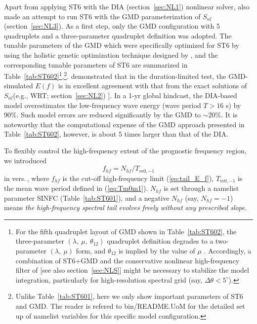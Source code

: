 Apart from applying {\code ST6} with the {\code DIA} (section~\ref{sec:NL1}) nonlinear solver, \citet{Liu2019}
also made an attempt to run {\code ST6} with the {\code GMD} parameterization of $S_{nl}$
(section~\ref{sec:NL3}). As a first step, only the {\code GMD} configuration with
5 quadruplets and a three-parameter quadruplet definition
\citep[i.e., {\code G35} in][]{tol:OMOD13d} was adopted. The tunable parameters
of the {\code GMD} which were specifically optimized for {\code ST6} by using the holistic
genetic optimization technique designed by \citet{tol:OMOD13e}, and the
corresponding tunable parameters of {\code ST6} are summarized in
Table~\ref{tab:ST602}\footnote{For the fifth quadruplet layout of {\code GMD} shown
in Table~\ref{tab:ST602}, the three-parameter $(\lambda,\ \mu,\ \theta_{12})$
quadruplet definition degrades to a two-parameter $(\lambda,\ \mu)$ form, and
$\theta_{12}$ is implied by the value of $\mu$ \citep{tol:OMOD13d}. Accordingly,
a combination of {\code ST6+GMD} and the conservative nonlinear high-frequency
filter of \citet{tol:OMOD11} [see also section~\ref{sec:NLS}] might be
necessary to stabilize the model integration, particularly for high-resolution
spectral grid (say, $\Delta \theta < 5^{\circ}$).},\footnote{Unlike
Table~\ref{tab:ST601}, here we only show important parameters of {\code ST6} and
{\code GMD}. The reader is refered to {\code bin/README.UoM} for the detailed
set up of namelist variables for this specific model configuration.}.
\citet{Liu2019} demonstrated that in the duration-limited test, the
{\code GMD}-simulated $E(f)$ is in excellent agreement with that from the exact
 solutions of $S_{nl}$(e.g., {\code WRT}; section~\ref{sec:NL2}) \citep[see also][]{tol:OMOD13d}]. In a 1-yr global
hindcast, the {\code DIA}-based model overestimates the low-frequency wave energy
(wave period $T > 16$ s) by 90\%. Such model errors are reduced significantly
by the {\code GMD} to $\sim$20\%. It is noteworthy that the computational expense
of the {\code GMD} approach presented in Table~\ref{tab:ST602}, however, is about
5 times larger than that of the {\code DIA}.

To flexibly control the high-frequency extent of the prognostic frequency
region, we introduced
\begin{equation}
f_{hf} = N_{hf}/T_{m0, -1}
\end{equation}
in vers.\,\WWver, where $f_{hf}$ is the cut-off high-frequency limit
(\ref{eq:tail_E_f}), $T_{m0,-1}$ is the mean wave period defined in
(\ref{eq:Tm0m1}). $N_{hf}$ is set through a namelist parameter SINFC
(Table~\ref{tab:ST601}), and a negative $N_{hf}$ (say, $N_{hf} = -1$)
means \emph{the high-frequency spectral tail evolves freely without any
prescribed slope.}

